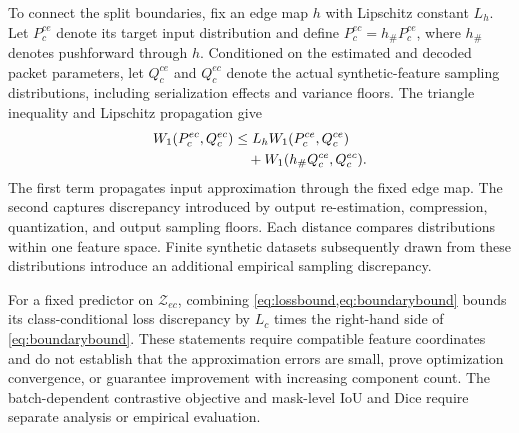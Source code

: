 To connect the split boundaries, fix an edge map $h$ with Lipschitz constant $L_h$. Let $P_c^{ce}$ denote its target input distribution and define $P_c^{ec}=h_\#P_c^{ce}$, where $h_\#$ denotes pushforward through $h$. Conditioned on the estimated and decoded packet parameters, let $Q_c^{ce}$ and $Q_c^{ec}$ denote the actual synthetic-feature sampling distributions, including serialization effects and variance floors. The triangle inequality and Lipschitz propagation give
\begin{equation}
\label{eq:boundarybound}
\begin{aligned}
W_1(P_c^{ec},Q_c^{ec})
&\leq
L_hW_1(P_c^{ce},Q_c^{ce})\\
&\quad+
W_1(h_\#Q_c^{ce},Q_c^{ec}).
\end{aligned}
\end{equation}
The first term propagates input approximation through the fixed edge map. The second captures discrepancy introduced by output re-estimation, compression, quantization, and output sampling floors. Each distance compares distributions within one feature space. Finite synthetic datasets subsequently drawn from these distributions introduce an additional empirical sampling discrepancy.

For a fixed predictor on $\mathcal Z_{ec}$, combining \cref{eq:lossbound,eq:boundarybound} bounds its class-conditional loss discrepancy by $L_c$ times the right-hand side of \cref{eq:boundarybound}. These statements require compatible feature coordinates and do not establish that the approximation errors are small, prove optimization convergence, or guarantee improvement with increasing component count. The batch-dependent contrastive objective and mask-level IoU and Dice require separate analysis or empirical evaluation.